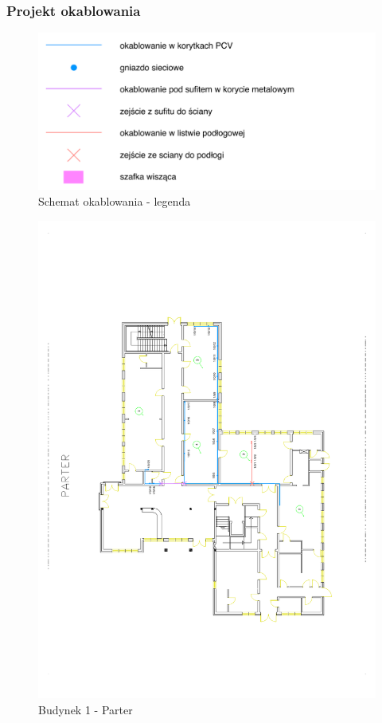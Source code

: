 \subsubsection{Projekt okablowania}
\begin{figure}[H]
  \begin{center}
    \includegraphics[width=\textwidth]{img/s/legenda.pdf}
    \caption{Schemat okablowania - legenda}
  \end{center}
\end{figure}


\newpage
\begin{figure}[H]
  \begin{center}
    \includegraphics[width=\textwidth]{img/s/b1-0.pdf}
    \caption{Budynek 1 - Parter}
  \end{center}
\end{figure}

